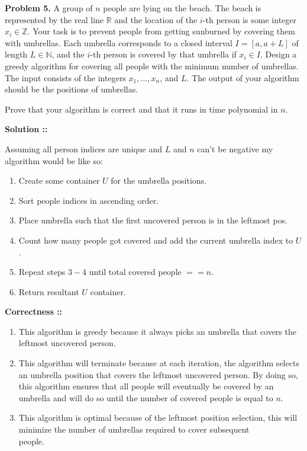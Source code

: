 \documentclass[11pt]{article}
\begin{document}
\pagebreak


\textbf{Problem 5.} A group of $n$ people are lying on the beach. The beach is 
represented by the real line $\mathbb{R}$ and the location of the $i$-th person is some 
integer $x_i\in\mathbb{Z}$. Your task is to prevent people from getting sunburned by 
covering them with umbrellas. Each umbrella corresponds to a closed interval 
$I = [a, a + L]$ of length $L\in\mathbb{N}$, and the $i$-th person is covered by that 
umbrella if $x_i\in I$. Design a greedy algorithm for covering all people with the
minimum number of umbrellas. The input consists of the integers $x_1, . . . , x_n$, 
and $L$. The output of your algorithm should be the positions of umbrellas.

\vspace{5px}
Prove that your algorithm is correct and that it runs in time polynomial in $n$.

\vspace{5px}\textbf{Solution ::}

Assuming all person indices are unique and $L$ and $n$ can't be negative
my algorithm would be like so:
\begin{enumerate}[1.]
    \item Create some container $U$ for the umbrella positions.
    \item Sort people indices in ascending order.
    \item Place umbrella such that the first uncovered person is in the leftmost pos.
    \item Count how many people got covered and add the current umbrella index to $U$.
    \item Repeat steps $3-4$ until total covered people $== n$.
    \item Return resultant $U$ container.
\end{enumerate}

\textbf{Correctness ::}
\begin{enumerate}[1.]
\item 
This algorithm is greedy because it always picks an umbrella that covers the leftmost
uncovered person.

\item 
This algorithm will terminate because at each iteration, the algorithm selects an
umbrella position that covers the leftmost uncovered person.
By doing so, this algorithm ensures that all people will eventually be covered
by an umbrella and will do so until the number of covered people is equal to $n$.

\item 
This algorithm is optimal because of the leftmost position selection, this will minimize
the number of umbrellas required to cover subsequent \\people.
\end{enumerate}
\pagebreak
\end{document}
